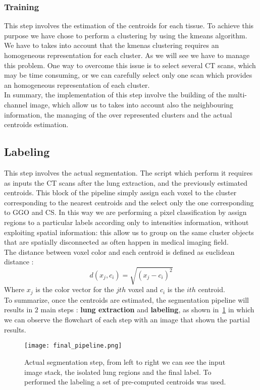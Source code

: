 \documentclass{standalone}
\begin{document}
	\subsubsection*{Training}
	
	This step involves the estimation of the centroids for each tissue. To achieve this purpose we have chose to perform a clustering by using the kmeans algorithm. We have to takes into account that the kmenas clustering requires an homogeneous representation for each cluster. As we will see we have to manage this problem. One way to overcome this issue is to select several CT scans, which may be time consuming, or we can carefully select only one scan which provides an homogeneous representation of each cluster.\\
	In summary, the implementation of this step involve the building of the multi-channel image, which allow us to takes into account also the neighbouring information, the managing of the over represented clusters  and the actual centroids estimation.

	\subsection*{Labeling}
	
	This step involves the actual segmentation. The script which perform it requires as inputs the CT scans after the lung extraction, and the previously estimated centroids. This block of the pipeline simply assign each voxel to the cluster corresponding to the nearest centroids and the select only the one corresponding to GGO and CS. In this way we are performing a pixel classification by assign regions to a particular labels according only to intensities information, without exploiting spatial information: this allow us to group on the same cluster objects that are spatially disconnected as often happen in medical imaging field.\\
	The distance between voxel color and each centroid is defined as euclidean distance :
	\begin{equation*}
		d(x_j, c_i) = \sqrt{(x_j - c_i)^2}
	\end{equation*} 
	Where $x_j$ is the color vector for the $jth$ voxel and $c_i$ is the $ith$ centroid.\\
	
	To summarize, once the centroids are estimated, the segmentation pipeline will results in $2$ main steps : \textbf{lung extraction} and \textbf{labeling}, as shown in \figurename\,\ref{fig:FinalPipeline} in which we can observe the flowchart of each step with an image that shown the partial results.
	
	\begin{figure}
		\centering
			\texttt{[image: final\_pipeline.png]}
			\label{fig:FinalPipeline}\caption{Actual segmentation step, from left to right we can see the input image stack, the isolated lung regions and the final label. To performed the labeling a set of pre-computed centroids was used.}
	\end{figure}
	
	
	
\end{document}
